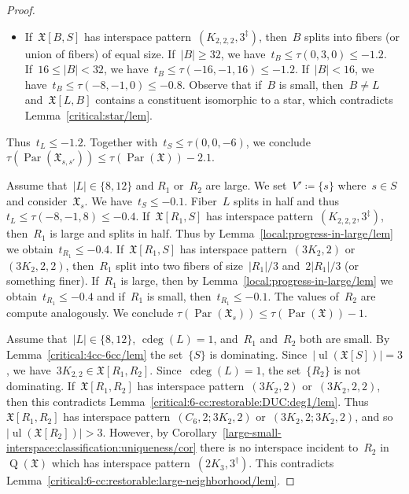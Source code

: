 \documentclass[english,a4paper]{article}
\theoremstyle{plain}
\theoremstyle{definition}
\newcommand{\abs}[1]{| #1 |}
\newcommand{\coherentConfig}{\ensuremath{\mathfrak{X}}}
\newcommand{\interspace}[2]{\ensuremath{\coherentConfig[#1,#2]}}
\newcommand{\inducedCC}[1]{\ensuremath{\coherentConfig[#1]}}
\DeclareMathOperator*{\ul}{ul}
\DeclareMathOperator*{\Quotient}{Q}
\newcommand{\quotientGraph}[1]{\ensuremath{\Quotient(#1)}}
\DeclareMathOperator{\ColorDeg}{cdeg}
\newcommand{\colorDeg}[1]{\ensuremath{\ColorDeg\left(#1\right)}}
\DeclareMathOperator{\parameters}{Par}
\newcommand{\ipsixMatching}             {\ensuremath{(\disjointCliques{3}{2},2)}}
\newcommand{\ipsixMatchingTwice}        {\ensuremath{(\disjointCliques{3}{2},2,2)}}
\newcommand{\ipsixMatchingMatching}     {\ensuremath{(\disjointCliques{3}{2},2;\disjointCliques{3}{2},2)}}
\newcommand{\ipsixMatchingAndCycle}     {\ensuremath{(\cycle{6},2;\disjointCliques{3}{2},2)}}
\newcommand{\ipsixTriangle}               {\ensuremath{(\disjointCliques{2}{3},3^\dag)}}
\newcommand{\ipsixMatchingComplementD}{\ensuremath{(\clique{2,2,2},3^\ddag)}}
\newcommand{\clique}[1]{\ensuremath{K_{#1}}}
\newcommand{\cycle}[1]{\ensuremath{C_{#1}}}
\newcommand{\disjointCliques}[2]{\ensuremath{#1 \clique{#2}}}
\begin{document}
\begin{proof}
\begin{itemize}
        \item
        If~$\interspace{B}{S}$ has interspace pattern~$\ipsixMatchingComplementD$, then~$B$ splits into  fibers (or union of fibers) of equal size.
        If~$|B| \geq 32$, we have~$t_{B} \leq \tau(0,3,0) \leq -1.2$.
        If~$16 \leq |B| < 32$, we have~$t_B \leq \tau(-16,-1,16) \leq -1.2$.
        If~$|B| < 16$, we have~$t_B \leq \tau(-8,-1,0) \leq -0.8$.
        Observe that if~$B$ is small, then~$B \neq L$ and~$\interspace{L}{B}$ contains a constituent isomorphic to a star, which contradicts Lemma~\ref{critical:star/lem}.
    \end{itemize}
    Thus~$t_L \leq -1.2$.
    Together with~$t_S \leq \tau(0,0,-6)$, we conclude $\tau(\parameters(\coherentConfig_{s,s'})) \leq \tau(\parameters(\coherentConfig)) - 2.1$.


    Assume that~$\abs{L} \in \{8,12\}$ and $R_1$ or~$R_2$ are large.
    We set~$V' \coloneqq \{s\}$ where~$s \in S$ and consider~$\coherentConfig_{s}$.
    We have~$t_S \leq -0.1$.
    Fiber~$L$ splits in half and thus~$t_L \leq \tau(-8,-1,8) \leq -0.4$.
    If~$\interspace{R_1}{S}$ has interspace pattern~$\ipsixMatchingComplementD$, then~$R_1$ is large and splits in half.
    Thus by Lemma~\ref{local:progress-in-large/lem} we obtain~$t_{R_1} \leq -0.4$.
    If~$\interspace{R_1}{S}$ has interspace pattern~$\ipsixMatching$  or~$\ipsixMatchingTwice$, then~$R_1$ split into two fibers of size~$|R_1|/3$ and~$2|R_1|/3$ (or something finer).
    If~$R_1$ is large, then by Lemma~\ref{local:progress-in-large/lem} we obtain~$t_{R_1} \leq -0.4$ and if~$R_1$ is small, then~$t_{R_1} \leq -0.1$.
    The values of~$R_2$ are compute analogously.
    We conclude $\tau(\parameters(\coherentConfig_{s})) \leq \tau(\parameters(\coherentConfig)) - 1$.

    Assume that~$\abs{L} \in \{8,12\}$, $\colorDeg{L} = 1$, and~$R_1$ and~$R_2$ both are small.
    By Lemma~\ref{critical:4cc-6cc/lem} the set~$\{S\}$ is dominating.
    Since~$|\ul(\inducedCC{S})| = 3$, we have~$\disjointCliques{3}{2,2} \in \interspace{R_1}{R_2}$.
    Since~$\colorDeg{L} = 1$, the set~$\{R_2\}$ is not dominating.
    If~$\interspace{R_1}{R_2}$ has interspace pattern~$\ipsixMatching$ or~$\ipsixMatchingTwice$, then this contradicts Lemma~\ref{critical:6-cc:restorable:DUC:deg1/lem}.
    Thus~$\interspace{R_1}{R_2}$ has interspace pattern~$\ipsixMatchingAndCycle$ or~$\ipsixMatchingMatching$, and so~$|\ul(\inducedCC{R_2})| >3$.
    However, by Corollary~\ref{large-small-interspace:classification:uniqueness/cor} there is no interspace incident to~$R_2$ in~$\quotientGraph{\coherentConfig}$ which has interspace pattern~$\ipsixTriangle$.
    This contradicts Lemma~\ref{critical:6-cc:restorable:large-neighborhood/lem}.


\end{proof}
\end{document}
